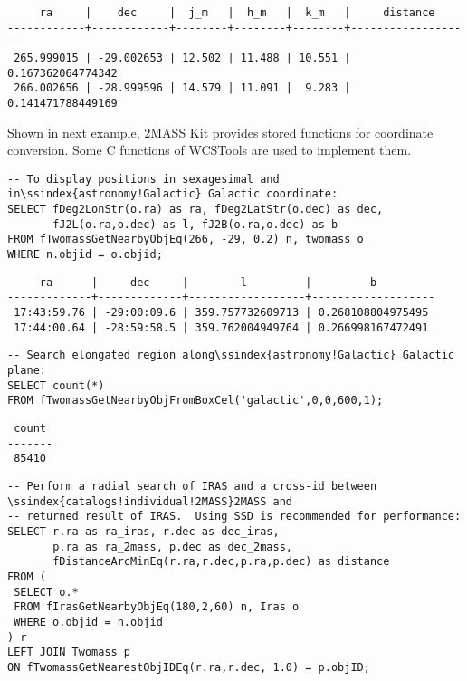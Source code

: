 {\small
\begin{verbatim}
     ra     |    dec     |  j_m   |  h_m   |  k_m   |     distance     
------------+------------+--------+--------+--------+-------------------
 265.999015 | -29.002653 | 12.502 | 11.488 | 10.551 | 0.167362064774342
 266.002656 | -28.999596 | 14.579 | 11.091 |  9.283 | 0.141471788449169
\end{verbatim}
}

Shown in next example, 2MASS Kit provides stored functions for coordinate conversion. Some C functions of WCSTools \citep{min_2006} are used to implement them.

\begin{verbatim}
-- To display positions in sexagesimal and in\ssindex{astronomy!Galactic} Galactic coordinate:
SELECT fDeg2LonStr(o.ra) as ra, fDeg2LatStr(o.dec) as dec, 
       fJ2L(o.ra,o.dec) as l, fJ2B(o.ra,o.dec) as b
FROM fTwomassGetNearbyObjEq(266, -29, 0.2) n, twomass o
WHERE n.objid = o.objid;
\end{verbatim}

{\small
\begin{verbatim}
     ra      |     dec     |        l         |         b         
-------------+-------------+------------------+-------------------
 17:43:59.76 | -29:00:09.6 | 359.757732609713 | 0.268108804975495
 17:44:00.64 | -28:59:58.5 | 359.762004949764 | 0.266998167472491
\end{verbatim}
}

\begin{verbatim}
-- Search elongated region along\ssindex{astronomy!Galactic} Galactic plane:
SELECT count(*) 
FROM fTwomassGetNearbyObjFromBoxCel('galactic',0,0,600,1);
\end{verbatim}

{\small
\begin{verbatim}
 count 
-------
 85410
\end{verbatim}
}

{\small
\begin{verbatim}
-- Perform a radial search of IRAS and a cross-id between \ssindex{catalogs!individual!2MASS}2MASS and
-- returned result of IRAS.  Using SSD is recommended for performance:
SELECT r.ra as ra_iras, r.dec as dec_iras,
       p.ra as ra_2mass, p.dec as dec_2mass,
       fDistanceArcMinEq(r.ra,r.dec,p.ra,p.dec) as distance
FROM (
 SELECT o.*
 FROM fIrasGetNearbyObjEq(180,2,60) n, Iras o
 WHERE o.objid = n.objid
) r
LEFT JOIN Twomass p
ON fTwomassGetNearestObjIDEq(r.ra,r.dec, 1.0) = p.objID;
\end{verbatim}
}

